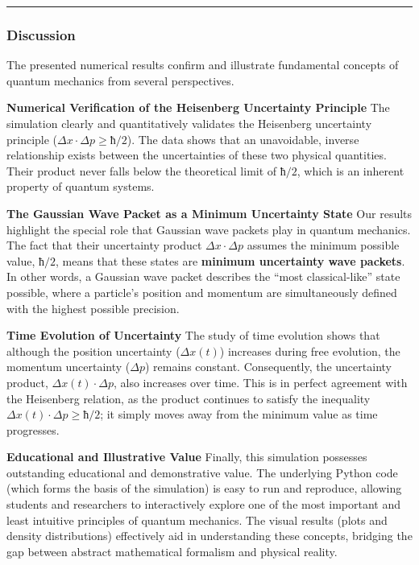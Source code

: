 \begin{center}\rule{0.5\linewidth}{0.5pt}\end{center}

\subsubsection{Discussion}\label{discussion}

The presented numerical results confirm and illustrate fundamental
concepts of quantum mechanics from several perspectives.

\textbf{Numerical Verification of the Heisenberg Uncertainty Principle}
The simulation clearly and quantitatively validates the Heisenberg
uncertainty principle (\(Δx·Δp ≥ ħ/2\)). The data shows that an
unavoidable, inverse relationship exists between the uncertainties of
these two physical quantities. Their product never falls below the
theoretical limit of \(ħ/2\), which is an inherent property of quantum
systems.

\textbf{The Gaussian Wave Packet as a Minimum Uncertainty State} Our
results highlight the special role that Gaussian wave packets play in
quantum mechanics. The fact that their uncertainty product \(Δx·Δp\)
assumes the minimum possible value, \(ħ/2\), means that these states are
\textbf{minimum uncertainty wave packets}. In other words, a Gaussian
wave packet describes the ``most classical-like'' state possible, where
a particle's position and momentum are simultaneously defined with the
highest possible precision.

\textbf{Time Evolution of Uncertainty} The study of time evolution shows
that although the position uncertainty (\(Δx(t)\)) increases during free
evolution, the momentum uncertainty (\(Δp\)) remains constant.
Consequently, the uncertainty product, \(Δx(t)·Δp\), also increases over
time. This is in perfect agreement with the Heisenberg relation, as the
product continues to satisfy the inequality \(Δx(t)·Δp ≥ ħ/2\); it
simply moves away from the minimum value as time progresses.

\textbf{Educational and Illustrative Value} Finally, this simulation
possesses outstanding educational and demonstrative value. The
underlying Python code (which forms the basis of the simulation) is easy
to run and reproduce, allowing students and researchers to interactively
explore one of the most important and least intuitive principles of
quantum mechanics. The visual results (plots and density distributions)
effectively aid in understanding these concepts, bridging the gap
between abstract mathematical formalism and physical reality.
